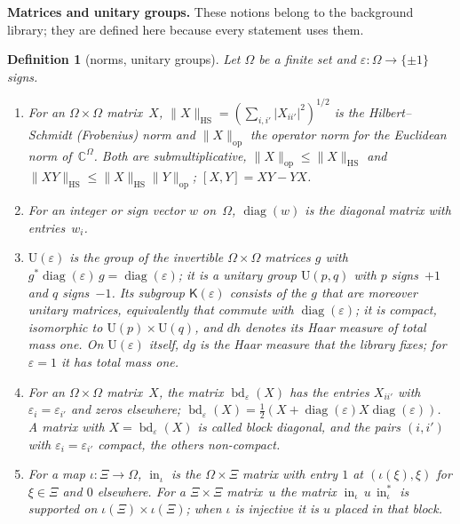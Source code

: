 \documentclass[11pt,a4paper]{article}
\newcommand{\m}[1]{\mbox{$#1$}}        %
\newcommand{\subhead}[1]{\par\addvspace{9pt plus 2pt}\Needspace{4\baselineskip}\noindent\textbf{#1}\enspace\ignorespaces}
\theoremstyle{plainx}
\theoremstyle{uprightx}
\newtheorem{definition}[theorem]{Definition}
\newcommand{\CC}{\mathbb{C}}
\newcommand{\abs}[1]{\lvert #1\rvert}
\newcommand{\hs}[1]{\lVert #1\rVert_{\mathrm{HS}}}
\newcommand{\op}[1]{\lVert #1\rVert_{\mathrm{op}}}
\newcommand{\comm}[2]{[#1,#2]}
\newcommand{\Us}[1]{\mathrm{U}(#1)}                      %
\newcommand{\Ks}[1]{\mathsf{K}(#1)}                      %
\newcommand{\bd}[2]{\operatorname{bd}_{#1}(#2)}          %
\newcommand{\inc}[1]{\operatorname{in}_{#1}}             %
\newcommand{\dg}[1]{\operatorname{diag}(#1)}             %
\begin{document}
\subhead{Matrices and unitary groups.} These notions belong to the background library; they are defined here
because every statement uses them.

\begin{definition}[norms, unitary groups]\label{d:mat}
Let $\Omega$ be a finite set and $\varepsilon\colon\Omega\to\{\pm1\}$ signs.
\begin{enumerate}[label=\textup{(\alph*)},leftmargin=2.3em,itemsep=1pt]
\item For an \m{\Omega\times\Omega} matrix~$X$, $\hs{X}=(\sum_{i,i'}\abs{X_{ii'}}^{2})^{1/2}$ is the
  Hilbert--Schmidt (Frobenius) norm and $\op{X}$ the operator norm for the Euclidean norm of~$\CC^{\Omega}$. Both are
  submultiplicative, \m{\op{X}\le\hs{X}} and \m{\hs{XY}\le\hs{X}\op{Y}}; \m{\comm{X}{Y}=XY-YX}.
\item For an integer or sign vector $w$ on~$\Omega$, $\dg{w}$ is the diagonal matrix with entries~$w_i$.
\item $\Us{\varepsilon}$ is the group of the invertible \m{\Omega\times\Omega} matrices $g$ with
  $g^{*}\dg{\varepsilon}\,g=\dg{\varepsilon}$; it is a unitary group $\mathrm{U}(p,q)$ with $p$ signs~$+1$ and $q$
  signs~$-1$. Its subgroup \m{\Ks{\varepsilon}} consists of the $g$ that are moreover unitary matrices,
  equivalently that commute with $\dg{\varepsilon}$; it is compact, isomorphic to $\mathrm{U}(p)\times\mathrm{U}(q)$,
  and \m{dh} denotes its Haar measure of total mass one. On $\Us{\varepsilon}$ itself, $dg$ is the Haar measure
  that the library fixes; for \m{\varepsilon=1} it has total mass one.
\item For an \m{\Omega\times\Omega} matrix~$X$, the matrix \m{\bd{\varepsilon}{X}} has the entries $X_{ii'}$ with
  \m{\varepsilon_i=\varepsilon_{i'}} and zeros elsewhere; $\bd{\varepsilon}{X}=\tfrac12(X+\dg{\varepsilon}X\dg{\varepsilon})$.
  A matrix with \m{X=\bd{\varepsilon}{X}} is called block diagonal, and the pairs \m{(i,i')} with
  \m{\varepsilon_i=\varepsilon_{i'}} compact, the others non-compact.
\item For a map \m{\iota\colon\Xi\to\Omega}, $\inc{\iota}$ is the \m{\Omega\times\Xi} matrix with entry $1$ at
  \m{(\iota(\xi),\xi)} for \m{\xi\in\Xi} and $0$ elsewhere. For a \m{\Xi\times\Xi} matrix~$u$ the matrix
  $\inc{\iota}\,u\,\inc{\iota}^{*}$ is supported on \m{\iota(\Xi)\times\iota(\Xi)}; when $\iota$ is injective it is $u$
  placed in that block.
\end{enumerate}
\end{definition}
\end{document}
